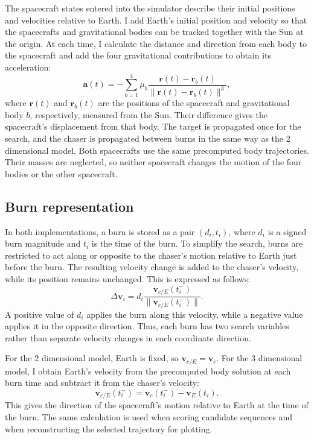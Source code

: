 \documentclass[11pt,letterpaper]{article}
\begin{document}
The spacecraft states entered into the simulator describe their initial
positions and velocities relative to Earth. I add Earth's initial
position and velocity so that the spacecrafts and gravitational bodies
can be tracked together with the Sun at the origin. At each time, I
calculate the distance and direction from each body to the spacecraft
and add the four gravitational contributions to obtain its acceleration:
\begin{equation}
  \mathbf a(t)=-\sum_{b=1}^{4}\mu_b
  \frac{\mathbf r(t)-\mathbf r_b(t)}
       {\|\mathbf r(t)-\mathbf r_b(t)\|^3},
  \label{eq:computed_3D_acceleration}
\end{equation}
where $\mathbf r(t)$ and $\mathbf r_b(t)$ are the positions of the
spacecraft and gravitational body $b$, respectively, measured from
the Sun. Their difference gives the spacecraft's displacement from that
body. The target is propagated once for the search, and the chaser is
propagated between burns in the same way as the 2 dimensional model.
Both spacecrafts use the same precomputed body trajectories. Their
masses are neglected, so neither spacecraft changes the motion of the
four bodies or the other spacecraft.

\subsection{Burn representation}
In both implementations, a burn is stored as a pair $(d_i,t_i)$, where
$d_i$ is a signed burn magnitude and $t_i$ is the time of the burn.
To simplify the search, burns are restricted to act along or opposite
to the chaser's motion relative to Earth just before the burn. The
resulting velocity change is added to the chaser's velocity, while its
position remains unchanged. This is expressed as follows:
\begin{equation}
  \Delta\mathbf v_i=d_i
  \frac{\mathbf v_{c/E}(t_i^-)}{\|\mathbf v_{c/E}(t_i^-)\|}.
  \label{eq:computed_burn_direction}
\end{equation}
A positive value of $d_i$ applies the burn along this velocity, while a
negative value applies it in the opposite direction. Thus, each burn
has two search variables rather than separate velocity changes in
each coordinate direction.

For the 2 dimensional model, Earth is fixed, so
$\mathbf v_{c/E}=\mathbf v_c$. For the 3 dimensional model, I obtain
Earth's velocity from the precomputed body solution at each burn time
and subtract it from the chaser's velocity:
\begin{equation}
  \mathbf v_{c/E}(t_i^-)=\mathbf v_c(t_i^-)-\mathbf v_E(t_i).
\end{equation}
This gives the direction of the spacecraft's motion relative to Earth
at the time of the burn. The same calculation is used when scoring candidate sequences
and when reconstructing the selected trajectory for plotting.
\end{document}
